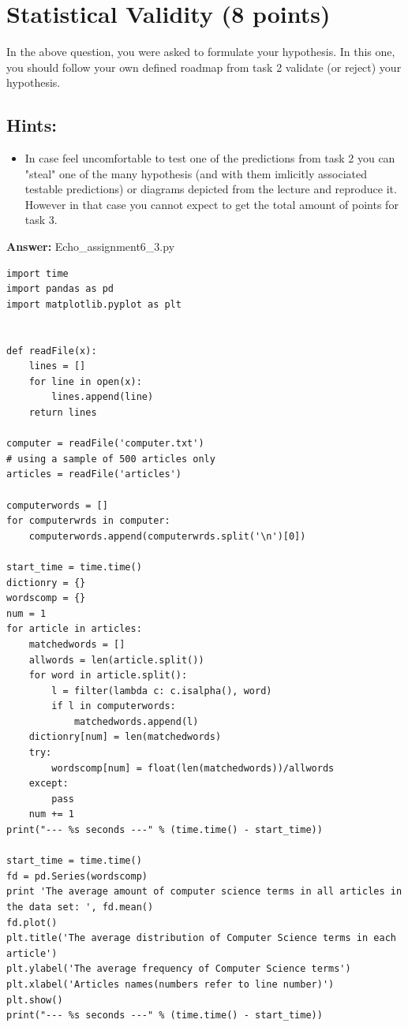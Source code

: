 \documentclass{WeSTassignment}
\begin{document}
\section{Statistical Validity (8 points)}
In the above question, you were asked to formulate your hypothesis. In this one, you should follow your own defined roadmap from task 2 validate (or reject) your hypothesis. 

\subsection{Hints:}
\begin{itemize}
\item In case feel uncomfortable to test one of the predictions from task 2 you can "steal" one of the many hypothesis (and with them imlicitly associated testable predictions) or diagrams depicted from the lecture and reproduce it. However in that case you cannot expect to get the total amount of points for task 3. 
\end{itemize}
\textbf{Answer:} Echo\_assignment6\_3.py \\
\begin{lstlisting}
import time
import pandas as pd
import matplotlib.pyplot as plt


def readFile(x):
    lines = []
    for line in open(x):
        lines.append(line)
    return lines

computer = readFile('computer.txt')
# using a sample of 500 articles only
articles = readFile('articles')

computerwords = []
for computerwrds in computer:
    computerwords.append(computerwrds.split('\n')[0])

start_time = time.time()
dictionry = {}
wordscomp = {}
num = 1
for article in articles:
    matchedwords = []
    allwords = len(article.split())
    for word in article.split():
        l = filter(lambda c: c.isalpha(), word)
        if l in computerwords:
            matchedwords.append(l)
    dictionry[num] = len(matchedwords)
    try:
        wordscomp[num] = float(len(matchedwords))/allwords
    except:
        pass
    num += 1
print("--- %s seconds ---" % (time.time() - start_time))

start_time = time.time()
fd = pd.Series(wordscomp)
print 'The average amount of computer science terms in all articles in the data set: ', fd.mean()
fd.plot()
plt.title('The average distribution of Computer Science terms in each article')
plt.ylabel('The average frequency of Computer Science terms')
plt.xlabel('Articles names(numbers refer to line number)')
plt.show()
print("--- %s seconds ---" % (time.time() - start_time))

\end{lstlisting}
\end{document}
